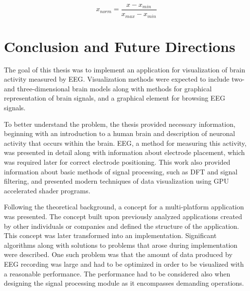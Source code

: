 \begin{equation}
\label{eq:xNorm}
x_{norm} = \frac{x - x_{min}}{x_{max} - x_{min}}
\end{equation}


\chapter{Conclusion and Future Directions}
The goal of this thesis was to implement an application for visualization of brain activity measured by EEG. Visualization methods were expected to include two- and three-dimensional brain models along with methods for graphical representation of brain signals, and a graphical element for browsing EEG signals.   

To better understand the problem, the thesis provided necessary information, beginning with an introduction to a human brain and description of neuronal activity that occurs within the brain. EEG, a method for measuring this activity, was presented in detail along with information about electrode placement, which was required later for correct electrode positioning. This work also provided information about basic methods of signal processing, such as DFT and signal filtering, and presented modern techniques of data visualization using GPU accelerated shader programs.

Following the theoretical background, a concept for a multi-platform application was presented. The concept built upon previously analyzed applications created by other individuals or companies and defined the structure of the application. This concept was later transformed into an implementation. Significant algorithms along with solutions to problems that arose during implementation were described. One such problem was that the amount of data produced by EEG recording was large and had to be optimized in order to be visualized with a reasonable performance. The performance had to be considered also when designing the signal processing module as it encompasses demanding operations.


